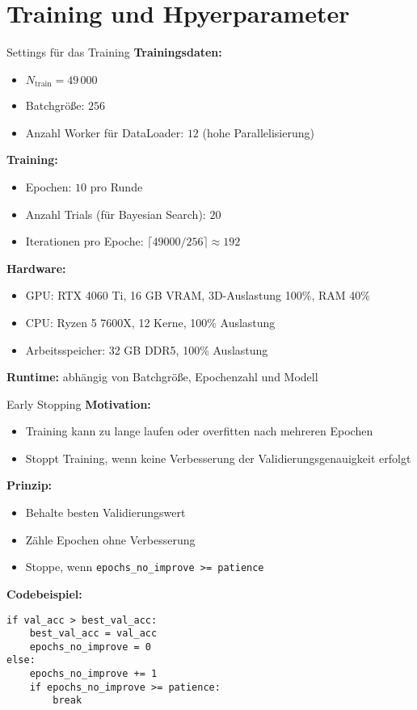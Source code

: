 \section{Training und Hpyerparameter}

\begin{frame}{Settings für das Training}
\textbf{Trainingsdaten:}
\begin{itemize}
    \item $N_{\text{train}} = 49\,000$
    \item Batchgröße: $256$ 
    \item Anzahl Worker für DataLoader: $12$ (hohe Parallelisierung)
\end{itemize}

\textbf{Training:}
\begin{itemize}
    \item Epochen: $10$ pro Runde
    \item Anzahl Trials (für Bayesian Search): $20$
    \item Iterationen pro Epoche: $\lceil 49000 / 256 \rceil \approx 192$
\end{itemize}

\textbf{Hardware:}
\begin{itemize}
    \item GPU: RTX 4060 Ti, 16 GB VRAM, 3D-Auslastung 100\%, RAM 40\%
    \item CPU: Ryzen 5 7600X, 12 Kerne, 100\% Auslastung
    \item Arbeitsspeicher: 32 GB DDR5, 100\% Auslastung
\end{itemize}

\textbf{Runtime:} abhängig von Batchgröße, Epochenzahl und Modell
\end{frame}



\begin{frame}[fragile]{Early Stopping}
\textbf{Motivation:} 
\begin{itemize}
    \item Training kann zu lange laufen oder overfitten nach mehreren Epochen
    \item Stoppt Training, wenn keine Verbesserung der Validierungsgenauigkeit erfolgt
\end{itemize}

\textbf{Prinzip:}
\begin{itemize}
    \item Behalte besten Validierungswert
    \item Zähle Epochen ohne Verbesserung
    \item Stoppe, wenn \texttt{epochs\_no\_improve >= patience}
\end{itemize}

\textbf{Codebeispiel:}
\begin{verbatim}
if val_acc > best_val_acc:
    best_val_acc = val_acc
    epochs_no_improve = 0
else:
    epochs_no_improve += 1
    if epochs_no_improve >= patience:
        break
\end{verbatim}
\end{frame}

